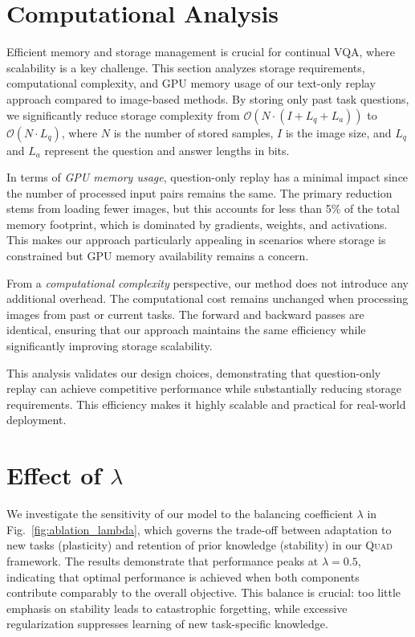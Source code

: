 \section{Computational Analysis}
\label{sec.computational}
Efficient memory and storage management is crucial for continual VQA, where scalability is a key challenge. This section analyzes storage requirements, computational complexity, and GPU memory usage of our text-only replay approach compared to image-based methods. By storing only past task questions, we significantly reduce storage complexity from $\mathcal{O}(N\cdot (I + L_q+L_a))$ to $\mathcal{O}(N\cdot L_q)$, where $N$ is the number of stored samples, $I$ is the image size, and $L_q$ and $L_a$ represent the question and answer lengths in bits.  

In terms of \textit{GPU memory usage}, question-only replay has a minimal impact since the number of processed input pairs remains the same. The primary reduction stems from loading fewer images, but this accounts for less than 5\% of the total memory footprint, which is dominated by gradients, weights, and activations. This makes our approach particularly appealing in scenarios where storage is constrained but GPU memory availability remains a concern.  

From a \textit{computational complexity} perspective, our method does not introduce any additional overhead. The computational cost remains unchanged when processing images from past or current tasks. The forward and backward passes are identical, ensuring that our approach maintains the same efficiency while significantly improving storage scalability.  

This analysis validates our design choices, demonstrating that question-only replay can achieve competitive performance while substantially reducing storage requirements. This efficiency makes it highly scalable and practical for real-world deployment.

\section{Effect of $\lambda$}
\label{sec:effect_lambda}
We investigate the sensitivity of our model to the balancing coefficient $\lambda$ in Fig.~\ref{fig:ablation_lambda}, which governs the trade-off between adaptation to new tasks (plasticity) and retention of prior knowledge (stability) in our \textsc{Quad} framework. The results demonstrate that performance peaks at $\lambda = 0.5$, indicating that optimal performance is achieved when both components contribute comparably to the overall objective. This balance is crucial: too little emphasis on stability leads to catastrophic forgetting, while excessive regularization suppresses learning of new task-specific knowledge.

